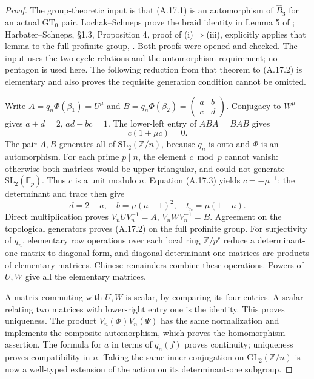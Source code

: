\begin{proof}
The group-theoretic input is that (A.17.1) is an automorphism of
$\widehat B_3$ for an actual $\widehat{\mathrm{GT}}_0$ pair.
Lochak--Schneps prove the braid identity in Lemma 5 of
\cite{A_LochakSchneps}; Harbater--Schneps, \S1.3, Proposition 4,
proof of (i)$\Rightarrow$(iii), explicitly applies that lemma to the
full profinite group, \cite{A_HarbaterSchneps}. Both proofs were
opened and checked. The input uses the two cycle relations and the
automorphism requirement; no pentagon is used here.
The following reduction from that theorem to (A.17.2) is elementary
and also proves the requisite generation condition cannot be omitted.

Write $A=q_n\Phi(\beta_1)=U^\mu$ and
$B=q_n\Phi(\beta_2)=\left(\begin{smallmatrix}a&b\\c&d\end{smallmatrix}\right)$.
Conjugacy to $W^\mu$ gives $a+d=2$, $ad-bc=1$.
The lower-left entry of $ABA=BAB$ gives
\[
 c(1+\mu c)=0.                                    \tag{A.17.3}
\]
The pair $A,B$ generates all of $\mathrm{SL}_2(\mathbb Z/n)$,
because $q_n$ is onto and $\Phi$ is an automorphism. For each prime
$p\mid n$, the element $c\bmod p$ cannot vanish: otherwise both
matrices would be upper triangular, and could not generate
$\mathrm{SL}_2(\mathbb F_p)$. Thus $c$ is a unit modulo $n$.
Equation (A.17.3) yields $c=-\mu^{-1}$; the determinant and trace
then give
\[
 d=2-a,\quad b=\mu(a-1)^2,\quad t_n=\mu(1-a).
\]
Direct multiplication proves
$V_nUV_n^{-1}=A$, $V_nWV_n^{-1}=B$. Agreement on the topological
generators proves (A.17.2) on the full profinite group.
For surjectivity of $q_n$, elementary row operations over each local
ring $\mathbb Z/p^r$ reduce a determinant-one matrix to diagonal
form, and diagonal determinant-one matrices are products of
elementary matrices. Chinese remainders combine these operations.
Powers of $U,W$ give all the elementary matrices.

A matrix commuting with $U,W$ is scalar, by comparing its four
entries. A scalar relating two matrices with lower-right entry one
is the identity. This proves uniqueness. The product $V_n(\Phi)
V_n(\Psi)$ has the same normalization and implements the composite
automorphism, which proves the homomorphism assertion. The formula
for $a$ in terms of $q_n(f)$ proves continuity; uniqueness proves
compatibility in $n$. Taking the same inner conjugation on
$\mathrm{GL}_2(\mathbb Z/n)$ is now a well-typed extension of the
action on its determinant-one subgroup.


\end{proof}
